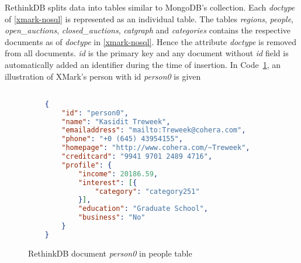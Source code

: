 RethinkDB splits data into tables similar to MongoDB's collection.  Each \textit{doctype} of \ref{xmark-nosql} is represented as an individual table. The tables \textit{regions}, \textit{people}, \textit{open\_auctions}, \textit{closed\_auctions}, \textit{catgraph} and \textit{categories} contains the respective documents as of \textit{doctype} in \ref{xmark-nosql}. Hence the attribute \textit{doctype} is removed from all documents.  \textit{id} is the primary key and any document without \textit{id} field is automatically added an identifier during the time of insertion. In Code~\ref{code:rethindb-person0}, an illustration of XMark's person with id \textit{person0} is given
\begin{figure}
\centering
\begin{lstlisting}[language=JSON,basicstyle =\scriptsize]

	{
		"id": "person0",
		"name": "Kasidit Treweek",
		"emailaddress": "mailto:Treweek@cohera.com",
		"phone": "+0 (645) 43954155",
		"homepage": "http://www.cohera.com/~Treweek",
		"creditcard": "9941 9701 2489 4716",
		"profile": {
			"income": 20186.59,
			"interest": [{
				"category": "category251"
			}],
			"education": "Graduate School",
			"business": "No"
		}
	}
\end{lstlisting}
\caption{RethinkDB document \textit{person0} in people table}
\label{code:rethindb-person0}
\end{figure}
	
